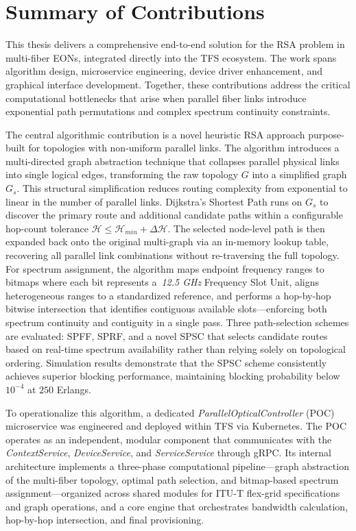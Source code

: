 \documentclass[12pt, a4paper, twoside, openright]{report}
\begin{document}
\section{Summary of Contributions}
This thesis delivers a comprehensive end-to-end solution for the RSA problem in multi-fiber EONs, integrated directly into the TFS ecosystem. The work spans algorithm design, microservice engineering, device driver enhancement, and graphical interface development. Together, these contributions address the critical computational bottlenecks that arise when parallel fiber links introduce exponential path permutations and complex spectrum continuity constraints.

The central algorithmic contribution is a novel heuristic RSA approach purpose-built for topologies with non-uniform parallel links. The algorithm introduces a multi-directed graph abstraction technique that collapses parallel physical links into single logical edges, transforming the raw topology $G$ into a simplified graph $G_s$. This structural simplification reduces routing complexity from exponential to linear in the number of parallel links. Dijkstra's Shortest Path runs on $G_s$ to discover the primary route and additional candidate paths within a configurable hop-count tolerance $\mathcal{H} \leq \mathcal{H}_{min} + \Delta\mathcal{H}$. The selected node-level path is then expanded back onto the original multi-graph via an in-memory lookup table, recovering all parallel link combinations without re-traversing the full topology. For spectrum assignment, the algorithm maps endpoint frequency ranges to bitmaps where each bit represents a~\emph{12.5 GHz} Frequency Slot Unit, aligns heterogeneous ranges to a standardized reference, and performs a hop-by-hop bitwise intersection that identifies contiguous available slots---enforcing both spectrum continuity and contiguity in a single pass. Three path-selection schemes are evaluated: SPFF, SPRF, and a novel SPSC that selects candidate routes based on real-time spectrum availability rather than relying solely on topological ordering. Simulation results demonstrate that the SPSC scheme consistently achieves superior blocking performance, maintaining blocking probability below $10^{-4}$ at $250$ Erlangs.

To operationalize this algorithm, a dedicated \emph{ParallelOpticalController} (POC) microservice was engineered and deployed within TFS via Kubernetes. The POC operates as an independent, modular component that communicates with the \emph{ContextService}, \emph{DeviceService}, and \emph{ServiceService} through gRPC. Its internal architecture implements a three-phase computational pipeline---graph abstraction of the multi-fiber topology, optimal path selection, and bitmap-based spectrum assignment---organized across shared modules for ITU-T flex-grid specifications and graph operations, and a core engine that orchestrates bandwidth calculation, hop-by-hop intersection, and final provisioning.
\end{document}
